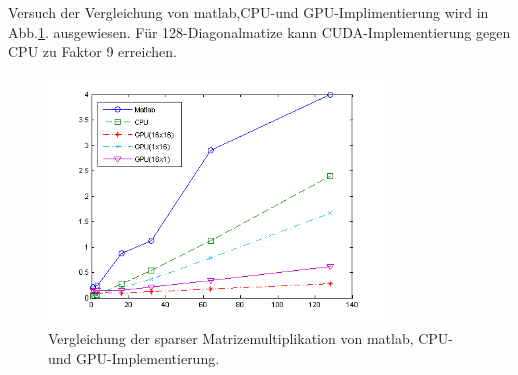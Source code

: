

Versuch der Vergleichung von matlab,CPU-und GPU-Implimentierung wird in Abb.\ref{sparse_ergebnis}. ausgewiesen. Für 128-Diagonalmatize kann CUDA-Implementierung gegen CPU zu Faktor 9 erreichen.


\begin{figure}[htbp]
\includegraphics[width=3.5in]{../xby/pic//sparse_ergebnis}
\caption{Vergleichung der sparser Matrizemultiplikation von matlab, CPU-und GPU-Implementierung.}
\label{sparse_ergebnis}
\end{figure}